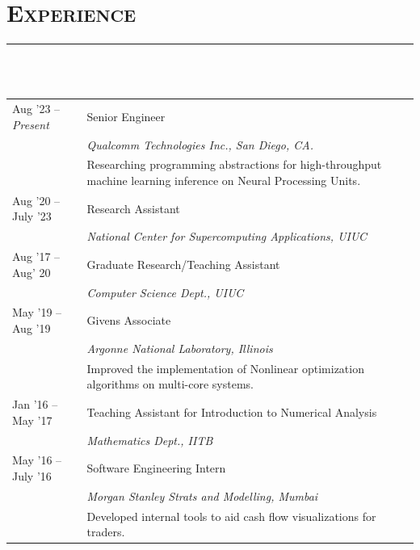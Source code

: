 \documentclass[letterpaper, 13pt]{article}
\begin{document}
\section*{\Large\textsc{Experience}}
\vspace{-4ex}
\rule{\textwidth}{0.1ex}\\
\vspace{1ex}\\
\begin{tabular}{p{} p{}}
Aug '23 -- \textit{Present} & Senior Engineer\\
                            &  \textit{\small Qualcomm Technologies Inc., San Diego, CA.}\\
                            & Researching programming abstractions for high-throughput machine learning inference on Neural Processing Units.\vspace{1ex} \\
Aug '20 -- July '23 &       Research Assistant\\
                            &   \textit{\small National Center for
                            Supercomputing Applications, UIUC}\vspace{1ex}\\
Aug '17 -- Aug' 20          &   Graduate Research/Teaching Assistant\\
                            &   \textit{\small Computer Science Dept., UIUC}\vspace{1ex}\\
May '19 -- Aug '19          &   Givens Associate\\
                            &   \textit{\small Argonne National Laboratory, Illinois}\\
                            & {\small Improved the implementation of Nonlinear optimization algorithms on multi-core systems.}\vspace{1ex}\\
Jan '16 -- May '17          &   Teaching Assistant for Introduction to Numerical Analysis\\
                            &   \textit{\small Mathematics Dept., IITB}\vspace{1ex}\\
May '16 -- July '16         &   Software Engineering Intern\\
                            &   \textit{\small Morgan Stanley Strats and Modelling, Mumbai}\\
                            & Developed internal tools to aid cash flow visualizations for traders.
\end{tabular}
\end{document}
